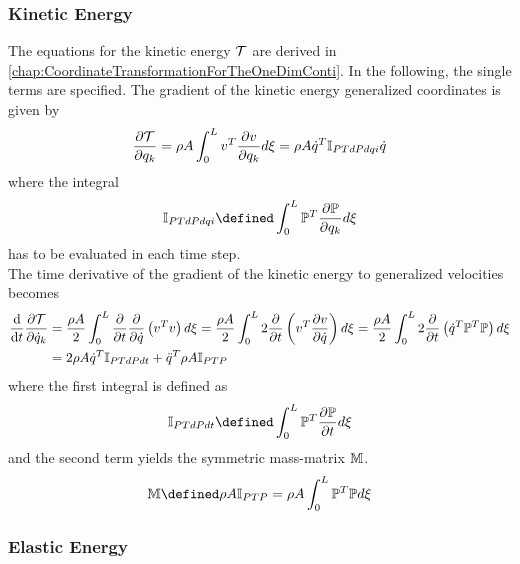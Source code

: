 \subsubsection{Kinetic Energy}
The equations for the kinetic energy $\cal T$ are derived in \cref{chap:CoordinateTransformationForTheOneDimConti}.
In the following, the single terms are specified. The gradient of the kinetic energy \wrt generalized coordinates is given by
%
\begin{align}
  \frac{\partial {\cal T}}{\partial {q_k}} = \rho A \int _{0} ^{L} v^T  \frac{\partial {v}}{\partial {q_k}} d \xi = \rho A \dot{q}^T \mathbb{I} _{PTdPdqi} \dot{q}
\end{align}
%
where the integral
%
\begin{align*}
  \msI _{PTdPdqi} \defined \int _{0} ^{L} \msP^T \pd{\msP}{q_k} d \xi
\end{align*}
%
has to be evaluated in each time step.\\
The time derivative of the gradient of the kinetic energy \wrt to generalized velocities becomes
%
\begin{align}
  \frac{\mathrm{d} }{\mathrm{d} t} \frac{\partial {\cal T}}{\partial {\dot{q}_k}} &= \frac{\rho A}{2}  \int _{0} ^{L} \frac{\partial {}}{\partial {t}} \frac{\partial {}}{\partial {\dot{q}}} \left(v^Tv\right) d \xi = \frac{\rho A}{2} \int _{0} ^{L} 2 \frac{\partial {}}{\partial {t}}\left(v^T \frac{\partial {v}}{\partial {\dot{q}}} \right) d \xi = \frac{\rho A}{2} \int _{0} ^{L} 2 \frac{\partial {}}{\partial {t}} \left( \dot{q}^T \mathbb{P}^T  \mathbb{P} \right) d \xi\\ 
  \label{eq:FinalKineticEnergyTerms}
  &=2 \rho A \dot{q}^T \mathbb{I} _{PTdPdt} + \ddot{q}^T \rho A \mathbb{I}_{PTP}
\end{align}
%
where the first integral is defined as
%
\begin{align}
  \label{eq:}
  \msI _{PTdPdt} \defined \int_0 ^L \msP^T \pdt{\msP} d \xi
\end{align}
%
and the second term yields the symmetric mass-matrix $\mathbb{M}$.
%
\begin{align}
  \label{eq:MassMatrix}
  \msM \defined \rho A \msI _{PTP} = \rho A \int _0 ^L \msP^T \msP d \xi
\end{align}
%

\subsubsection{Elastic Energy}

